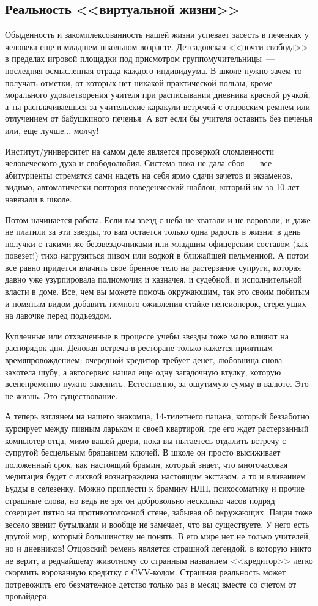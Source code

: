 \documentclass{scrbook}
\newcommand{\flqq}{<<}
\newcommand{\frqq}{>>}
\newcommand{\mdash}{~--- }
\newcommand{\essaysection}[1]{\subsection*{#1}\nopagebreak}
\begin{document}
\essaysection{Реальность {\flqq}виртуальной жизни{\frqq}}

Обыденность и закомплексованность нашей жизни успевает засесть в печенках у человека еще в младшем школьном возрасте. Детсадовская {\flqq}почти свобода{\frqq} в пределах игровой площадки под присмотром группомучительницы{\mdash}последняя осмысленная отрада каждого индивидуума. В школе нужно зачем-то получать отметки, от которых нет никакой практической пользы, кроме морального удовлетворения учителя при расписывании дневника красной ручкой, а ты расплачиваешься за учительские каракули встречей с отцовским ремнем или отлучением от бабушкиного печенья. А вот если бы учителя оставить без печенья или, еще лучше... молчу!

Институт/университет на самом деле является проверкой сломленности человеческого духа и свободолюбия. Система пока не дала сбоя{\mdash}все абитуриенты стремятся сами надеть на себя ярмо сдачи зачетов и экзаменов, видимо, автоматически повторяя поведенческий шаблон, который им за 10 лет навязали в школе.

Потом начинается работа. Если вы звезд с неба не хватали и не воровали, и даже не платили за эти звезды, то вам остается только одна радость в жизни: в день получки с такими же беззвездочниками или младшим офицерским составом (как повезет!) тихо нагрузиться пивом или водкой в ближайшей пельменной. А потом все равно придется влачить свое бренное тело на растерзание супруги, которая давно уже узурпировала полномочия и казначея, и судебной, и исполнительной власти в доме. Все, чем вы можете помочь окружающим, так это своим побитым и помятым видом добавить немного оживления стайке пенсионерок, стерегущих на лавочке перед подъездом.

Купленные или отхваченные в процессе учебы звезды тоже мало влияют на распорядок дня. Деловая встреча в ресторане только кажется приятным времяпровождением: очередной кредитор требует денег, любовница снова захотела шубу, а автосервис нашел еще одну загадочную втулку, которую всенепременно нужно заменить. Естественно, за ощутимую сумму в валюте. Это не жизнь. Это существование.

А теперь взглянем на нашего знакомца, 14-тилетнего пацана, который беззаботно курсирует между пивным ларьком и своей квартирой, где его ждет растерзанный компьютер отца, мимо вашей двери, пока вы пытаетесь отдалить встречу с супругой бесцельным бряцанием ключей. В школе он просто высиживает положенный срок, как настоящий брамин, который знает, что многочасовая медитация будет с лихвой вознаграждена настоящим экстазом, а то и вливанием Будды в селезенку. Можно приплести к брамину НЛП, психосоматику и прочие страшные слова, но ведь не зря он добровольно несколько часов подряд созерцает пятно на противоположной стене, забывая об окружающих. Пацан тоже весело звенит бутылками и вообще не замечает, что вы существуете. У него есть другой мир, который большинству не понять. В его мире нет не только учителей, но и дневников! Отцовский ремень является страшной легендой, в которую никто не верит, а редчайшему животному со странным названием {\flqq}кредитор{\frqq} легко скормить ворованную кредитку с CVV-кодом. Страшная реальность может потревожить его безмятежное детство только раз в месяц вместе со счетом от провайдера.
\end{document}

